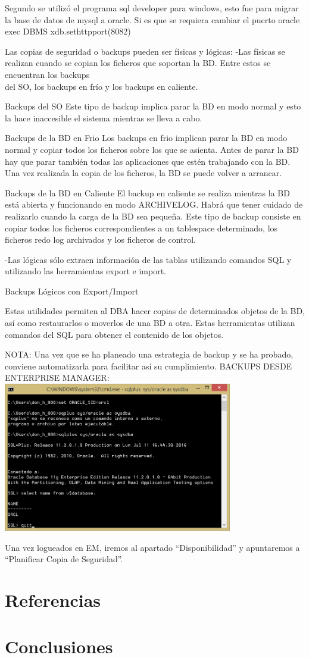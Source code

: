 \documentclass[12pt,letterpaper]{article}
\begin{document}
Segundo se utilizó el programa sql developer para windows, esto fue para migrar la base de datos de mysql a oracle.
Si es que se requiera cambiar el puerto  oracle exec DBMS xdb.sethttpport(8082)

Las copias de seguridad o backups pueden ser físicas y lógicas:
-Las físicas se realizan cuando se copian los ficheros que soportan la BD. Entre estos se encuentran los backups\\
del SO, los backups en frío y los backups en caliente.

Backups del SO
Este tipo de backup implica parar la BD en modo normal y esto la hace inaccesible el sistema mientras se lleva a cabo.

Backups de la BD en Frio
Los backups en frio implican parar la BD en modo normal y copiar todos los ficheros sobre los que se asienta. Antes de parar la BD hay que parar también todas las aplicaciones que estén trabajando con la BD. Una vez realizada la copia de los ficheros, la BD se puede volver a arrancar.

Backups de la BD en Caliente
El backup en caliente se realiza mientras la BD está abierta y funcionando en modo ARCHIVELOG. Habrá que tener cuidado de realizarlo cuando la carga de la BD sea pequeña. Este tipo de backup consiste en copiar todos los ficheros correspondientes a un tablespace determinado, los ficheros redo log archivados y los ficheros de control.


-Las lógicas sólo extraen información de las tablas utilizando comandos SQL y utilizando las herramientas export e import.

Backups Lógicos con Export/Import

Estas utilidades permiten al DBA hacer copias de determinados objetos de la BD, así como restaurarlos o moverlos de una BD a otra. Estas herramientas utilizan comandos del SQL para obtener el contenido de los objetos.

NOTA: Una vez que se ha planeado una estrategia de backup y se ha probado, conviene automatizarla para facilitar así su cumplimiento.
\newpage
BACKUPS  DESDE  ENTERPRISE  MANAGER:\\

\includegraphics[width=10cm]{./imagen/imagen-1}

Una vez logueados en EM, iremos al apartado “Disponibilidad” y apuntaremos a
“Planificar Copia de Seguridad”.

\newpage
\section{Referencias}
\newpage 
\section{Conclusiones} 
\end{document}
